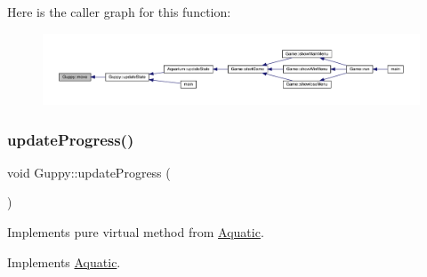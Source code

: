 Here is the caller graph for this function\+:
\nopagebreak
\begin{figure}[H]
\begin{center}
\leavevmode
\includegraphics[width=350pt]{class_guppy_ae6002948d74b3741bed34a7311be4377_icgraph}
\end{center}
\end{figure}
\mbox{\label{class_guppy_af22eacc4a1ea7bec4be7b5d82148407b}} 
\subsubsection{\texorpdfstring{update\+Progress()}{updateProgress()}}
{\footnotesize\ttfamily void Guppy\+::update\+Progress (\begin{DoxyParamCaption}{ }\end{DoxyParamCaption})\hspace{0.3cm}{\ttfamily [virtual]}}



Implements pure virtual method from \mbox{\hyperlink{class_aquatic}{Aquatic}}. 



Implements \mbox{\hyperlink{class_aquatic_ae1b6301ed27d6aadb73c7ee7879c24af}{Aquatic}}.

